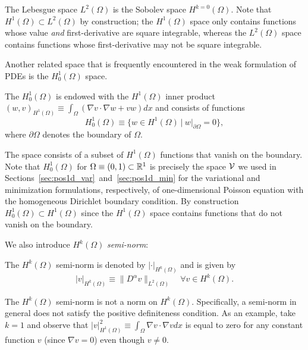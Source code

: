 The Lebesgue space $L^2(\Omega)$ is the Sobolev space $H^{k=0}(\Omega)$. Note that $H^1(\Omega) \subset L^2(\Omega)$ by construction; the $H^1(\Omega)$ space only contains functions whose value \emph{and} first-derivative are square integrable, whereas the $L^2(\Omega)$ space contains functions whose first-derivative may not be square integrable.

Another related space that is frequently encountered in the weak formulation of PDEs is the $H^1_0(\Omega)$ space.
\begin{definition} The $H^1_0(\Omega)$ is endowed with the $H^1(\Omega)$ inner product $(w,v)_{H^1(\Omega)} \equiv \int_\Omega (\nabla v \cdot \nabla w + v w) dx$ and consists of functions
\begin{equation*}
  H^1_0(\Omega) \equiv \{ w \in H^1(\Omega) \ | \ w|_{\partial \Omega} = 0 \},
\end{equation*}
where $\partial \Omega$ denotes the boundary of $\Omega$.
\end{definition}
The space consists of a subset of $H^1(\Omega)$ functions that vanish on the boundary.  Note that $H^1_0(\Omega)$ for $\Omega \equiv (0,1) \subset \mathbb{R}^1$ is precisely the space $\mathcal{V}$ we used in Sections~\eqref{sec:pos1d_var}~and~\eqref{sec:pos1d_min} for the variational and minimization formulations, respectively, of one-dimensional Poisson equation with the homogeneous Dirichlet boundary condition.  By construction $H^1_0(\Omega) \subset H^1(\Omega)$ since the $H^1(\Omega)$ space contains functions that do not vanish on the boundary.

We also introduce $H^k(\Omega)$ \emph{semi-norm}:
\begin{definition}
  The $H^k(\Omega)$ semi-norm is denoted by $| \cdot |_{H^k(\Omega)}$ and is given by
  \begin{equation*}
    | v |_{H^k(\Omega)} \equiv \| D^\alpha v \|_{L^2(\Omega)} \quad \forall v \in H^k(\Omega).
  \end{equation*}  
\end{definition}
\begin{remark}
  The $H^k(\Omega)$ semi-norm is not a norm on $H^k(\Omega)$.  Specifically, a semi-norm in general does not satisfy the positive definiteness condition.  As an example, take $k = 1$ and observe that $| v |^2_{H^1(\Omega)} \equiv \int_{\Omega} \nabla v \cdot \nabla v dx$ is equal to zero for any constant function $v$ (since $\nabla v = 0$) even though $v \neq 0$.
\end{remark}

